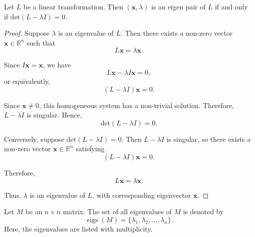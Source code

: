 \begin{theorem}
	Let \( L \) be a linear transformation. Then \( (\mathbf{x}, \lambda) \) is an eigen pair of \( L \) if and only if \( \mathrm{det}(L - \lambda I) = 0\).
\end{theorem}
\begin{proof}
	Suppose \( \lambda \) is an eigenvalue of \( L \). Then there exists a non-zero vector \( \mathbf{x} \in \mathbb{R}^n \) such that
	\begin{equation}
		L \mathbf{x} = \lambda \mathbf{x}.
		\label{eq:eigenvectors-and-eigenvalues-2}
	\end{equation}

	Since \( I \mathbf{x} = \mathbf{x} \), we have
	\begin{equation}
		L \mathbf{x} - \lambda I \mathbf{x} = 0,
		\label{eq:eigenvectors-and-eigenvalues-3}
	\end{equation}
	or equivalently,
	\begin{equation}
		(L - \lambda I)\mathbf{x} = 0.
		\label{eq:eigenvectors-and-eigenvalues-4}
	\end{equation}

	Since \( \mathbf{x} \neq 0 \), this homogeneous system has a non-trivial solution. Therefore, \( L - \lambda I \) is singular. Hence,
	\begin{equation}
		\mathrm{det}(L - \lambda I) = 0.
		\label{eq:eigenvectors-and-eigenvalues-5}
	\end{equation}

	Conversely, suppose \( \mathrm{det}(L - \lambda I) = 0 \). Then \( L - \lambda I \) is singular, so there exists a non-zero vector \( \mathbf{x} \in \mathbb{R}^n \) satisfying
	\begin{equation}
		(L - \lambda I)\mathbf{x} = 0.
		\label{eq:eigenvectors-and-eigenvalues-6}
	\end{equation}

	Therefore,
	\begin{equation}
		L \mathbf{x} = \lambda \mathbf{x}.
		\label{eq:eigenvectors-and-eigenvalues-7}
	\end{equation}

	Thus, \( \lambda \) is an eigenvalue of \( L \), with corresponding eigenvector \( \mathbf{x} \).
\end{proof}


\begin{definition}
	Let \( M \) be an \( n \times n \) matrix. The set of all eigenvalues of \( M \) is denoted by
	\begin{equation}
		\operatorname{eigs}(M) = \{ \lambda_1, \lambda_2, \ldots, \lambda_n \}.
		\label{eq:eigenvalues-of-matrix-1}
	\end{equation}
	Here, the eigenvalues are listed with multiplicity.
\end{definition}

